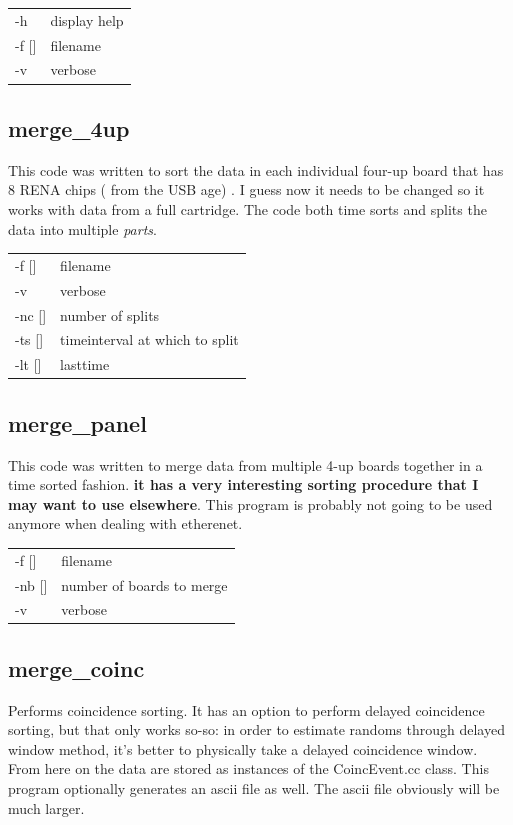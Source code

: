 \documentclass[12pt]{article}
\begin{document}
\begin{tabular}{ll}
-h & display help\\
-f []& filename\\
-v & verbose\\
\end{tabular}

\subsection{merge\_4up}
This code was written to sort the data in each individual four-up board that has 8 RENA chips ( from the USB age) . I guess now it needs to be changed so it works with data from a full cartridge. The code both time sorts and splits the data into multiple {\em parts}. \\

\begin{tabular}{ll}
-f []& filename\\
-v & verbose\\
-nc []& number of splits\\
-ts []& timeinterval at which to split\\
-lt []& lasttime \\
\end{tabular}


\subsection{merge\_panel}
This code was written to merge data from multiple 4-up boards together in a
time sorted fashion. {\bf it has a very interesting sorting procedure that I
  may want to use elsewhere}. This program is probably not going to be used
anymore when dealing with etherenet. \\

\begin{tabular}{ll}
-f []&filename\\
-nb [] & number of boards to merge\\
-v & verbose\\
\end{tabular}


\subsection{merge\_coinc}
Performs coincidence sorting. It has an option to perform delayed coincidence sorting, but that only works so-so: in order to estimate randoms through delayed window method, it's better to physically take a delayed coincidence window. From here on the data are stored as instances of the CoincEvent.cc class. This program optionally generates an ascii file as well. The ascii file obviously will be much larger.\\
\end{document}
